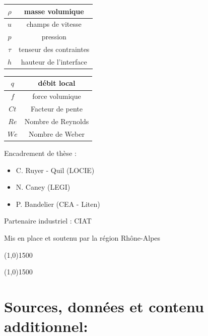 \documentclass[a0,portrait,11pt]{a0poster}
\begin{document}
\begin{multicols}{2}
    \begin{center}
        \begin{tabular}{|c|c|}
            \hline $\rho$ & masse volumique \\
            \hline $u$ & champs de vitesse \\
            \hline $p$ & pression \\
            \hline $\tau$ & tenseur des contraintes \\
            \hline $h$ & hauteur de l'interface \\
            \hline
        \end{tabular}
        \begin{tabular}{|c|c|}
            \hline $q$ & débit local \\
            \hline $f$ & force volumique \\
            \hline $Ct$ & Facteur de pente \\
            \hline $Re$ & Nombre de Reynolds \\
            \hline $W\!e$ & Nombre de Weber \\
            \hline
        \end{tabular}
    \end{center}

        Encadrement de thèse :
        \begin{itemize}
            \item C. Ruyer - Quil (LOCIE)
            \item N. Caney (LEGI)
            \item P. Bandelier (CEA - Liten)
        \end{itemize}

        Partenaire industriel : CIAT

        Mis en place et soutenu par la région Rhône-Alpes
\end{multicols}

\begin{center}
    \line(1,0){1500}
\end{center}

\printbibliography

\begin{center}
    \line(1,0){1500}
\end{center}

\section*{Sources, données et contenu additionnel: }
\end{document}
